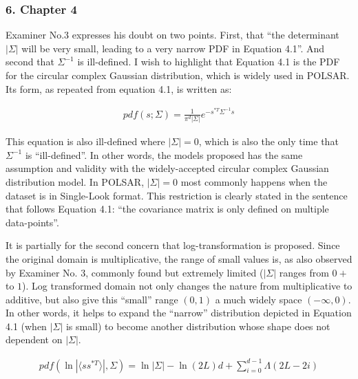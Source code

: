 \documentclass{article}
\begin{document}
\subsubsection*{6. Chapter 4}

Examiner No.3 expresses his doubt on two points.
First, that ``the determinant $|\Sigma|$ will be very small, leading to a very narrow PDF in Equation 4.1''.
And second that $\Sigma^{-1}$ is ill-defined.
I wish to highlight that Equation 4.1 is the PDF for the circular complex Gaussian distribution, which is widely used in POLSAR.
Its form, as repeated from equation 4.1, is written as:

\begin{align*}
  pdf(s;\Sigma)=\frac{1}{\pi^d |\Sigma|} e^{-s^{*T}\Sigma^{-1}s}
\end{align*}  

This equation is also ill-defined where $|\Sigma|=0$, which is also the only time that $\Sigma^{-1}$ is ``ill-defined''.
In other words, the models proposed has the same assumption and validity with the widely-accepted circular complex Gaussian distribution model.
In POLSAR, $|\Sigma|=0$ most commonly happens when the dataset is in Single-Look format.
This restriction is clearly stated in the sentence that follows Equation 4.1: ``the covariance matrix is only defined on multiple data-points''.

It is partially for the second concern that log-transformation is proposed.
Since the original domain is multiplicative, the range of small values is, as also observed by Examiner No. 3, commonly found but extremely limited ($|\Sigma|$ ranges from $0+$ to $1$).
Log transformed domain not only changes the nature from multiplicative to additive, but also give this ``small'' range $(0,1)$ a much widely space $(-\infty,0)$.
In other words, it helps to expand the ``narrow'' distribution depicted in Equation 4.1 (when $|\Sigma|$ is small) to become another distribution whose shape does not dependent on $|\Sigma|$.

\begin{align*}
  pdf( \ln | \langle ss^{*T} \rangle|, \Sigma) = \ln |\Sigma| - \ln(2L)d + \sum^{d-1}_{i=0} \Lambda (2L-2i)
\end{align*}  
\end{document}
